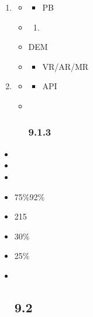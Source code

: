 \begin{enumerate}
\def\labelenumi{\arabic{enumi}.}
\item
  \important{}

  \begin{itemize}
  \item
    \begin{itemize}
    \tightlist
    \item
      PB
    \end{itemize}
  \item
    \begin{enumerate}
    \def\labelenumii{\arabic{enumii}.}
        \item
      \important{}
    \end{enumerate}
  \item
    DEM
  \item
    \begin{itemize}
    \tightlist
    \item
      VR/AR/MR
    \end{itemize}
  \end{itemize}
\item
  \important{}

  \begin{itemize}
  \item
    \begin{itemize}
    \tightlist
    \item
      API
    \end{itemize}
  \item ~
    \hypertarget{section-3}{%
    \subsubsection{9.1.3}\label{section-3}}
  \end{itemize}
\end{enumerate}

\important{}

\begin{itemize}
\item
  \important{}
\item
\item
  \important{}
\end{itemize}

\important{}

\begin{itemize}
\item
  75\%92\%
\item
  215
\item
  30\%
\item
  25\%
\item ~
  \hypertarget{section-4}{%
  \subsection{9.2}\label{section-4}}
\end{itemize}

